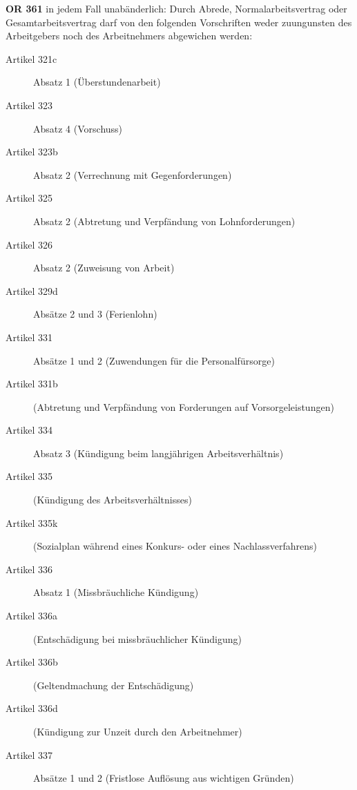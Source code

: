 \textbf{OR 361} in jedem Fall unabänderlich:
Durch Abrede, Normalarbeitsvertrag oder Gesamtarbeitsvertrag darf von den folgenden Vorschriften weder zuungunsten des Arbeitgebers noch des Arbeitnehmers abgewichen werden:
\begin{description}
    \item[Artikel 321c]
    Absatz 1 (Überstundenarbeit)

    \item[Artikel 323]
    Absatz 4 (Vorschuss)

    \item[Artikel 323b]
    Absatz 2 (Verrechnung mit Gegenforderungen)

    \item[Artikel 325]
    Absatz 2 (Abtretung und Verpfändung von Lohnforderungen)

    \item[Artikel 326]
    Absatz 2 (Zuweisung von Arbeit)

    \item[Artikel 329d]
    Absätze 2 und 3 (Ferienlohn)

    \item[Artikel 331]
    Absätze 1 und 2 (Zuwendungen für die Personalfürsorge)

    \item[Artikel 331b]
    (Abtretung und Verpfändung von Forderungen auf Vorsorgeleistungen)

    \item[Artikel 334]
    Absatz 3 (Kündigung beim langjährigen Arbeitsverhältnis)

    \item[Artikel 335]
    (Kündigung des Arbeitsverhältnisses)

    \item[Artikel 335k]
    (Sozialplan während eines Konkurs- oder eines Nachlassverfahrens)

    \item[Artikel 336]
    Absatz 1 (Missbräuchliche Kündigung)

    \item[Artikel 336a]
    (Entschädigung bei missbräuchlicher Kündigung)

    \item[Artikel 336b]
    (Geltendmachung der Entschädigung)

    \item[Artikel 336d]
    (Kündigung zur Unzeit durch den Arbeitnehmer)

    \item[Artikel 337]
    Absätze 1 und 2 (Fristlose Auflösung aus wichtigen Gründen)


\end{description}
